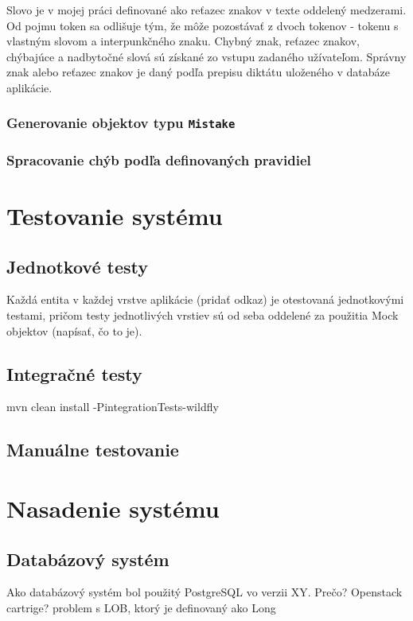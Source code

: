 \documentclass[12pt,oneside]{fithesis2}
\begin{document}
	\par Slovo je v mojej práci definované ako reťazec znakov v texte oddelený medzerami. Od pojmu token sa odlišuje tým, že môže pozostávať z dvoch tokenov - tokenu s vlastným slovom a interpunkčného znaku. Chybný znak, reťazec znakov, chýbajúce a nadbytočné slová sú získané zo vstupu zadaného užívateľom. Správny znak alebo reťazec znakov je daný podľa prepisu diktátu uloženého v databáze aplikácie.
	  \subsection{Generovanie objektov typu \texttt{Mistake}}
	  
      \subsection{Spracovanie chýb podľa definovaných pravidiel}
     	            
    \chapter{Testovanie systému}
      \section{Jednotkové testy}
      \par Každá entita v každej vrstve aplikácie (pridať odkaz) je otestovaná jednotkovými testami, pričom testy jednotlivých vrstiev sú od seba oddelené za použitia Mock objektov (napísať, čo to je).
      \section{Integračné testy}
      \par mvn clean install -PintegrationTests-wildfly
      \section{Manuálne testovanie}
    \chapter{Nasadenie systému} \label{nasadenie}
      \section{Databázový systém}
      \par Ako databázový systém bol použitý PostgreSQL vo verzii XY. Prečo? Openstack cartrige? problem s LOB, ktorý je definovaný ako Long
\end{document}
